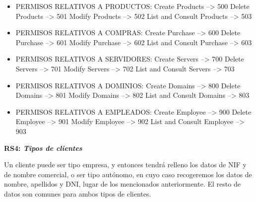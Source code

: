 \documentclass[paper=a4, fontsize=11pt, spanish]{scrartcl}
\begin{document}
\begin{itemize}
\item PERMISOS RELATIVOS A PRODUCTOS:
\newline    Create Products           --> 500
\newline    Delete Products           --> 501
\newline    Modify Products           --> 502
\newline    List and Consult Products --> 503

\item PERMISOS RELATIVOS A COMPRAS:
\newline    Create Purchase             --> 600
\newline    Delete Purchase             --> 601
\newline    Modify Purchase             --> 602
\newline    List and Consult Purchase   --> 603

\item PERMISOS RELATIVOS A SERVIDORES:
\newline    Create Servers            --> 700
\newline    Delete Servers            --> 701
\newline    Modify Servers            --> 702
\newline    List and Consult Servers  --> 703

\item PERMISOS RELATIVOS A DOMINIOS:
\newline    Create Domains            --> 800
\newline    Delete Domains            --> 801
\newline    Modify Domains            --> 802
\newline    List and Consult Domains  --> 803

\item PERMISOS RELATIVOS A EMPLEADOS:
\newline    Create Employee            --> 900
\newline    Delete Employee            --> 901
\newline    Modify Employee            --> 902
\newline    List and Consult Employee  --> 903

\end{itemize}

\setlength{\parindent}{0em}
\textbf{RS4: \textit{Tipos de clientes}}
\setlength{\parindent}{2em}

Un cliente puede ser tipo empresa, y entonces tendrá relleno los datos de NIF y de nombre comercial, o ser tipo autónomo, en cuyo caso recogeremos los datos de nombre, apellidos y DNI, lugar de los mencionados anteriormente. El resto de datos son comunes para ambos tipos de clientes.
\end{document}
